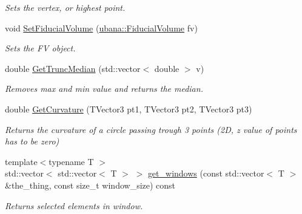 \begin{DoxyCompactItemize}
\begin{DoxyCompactList}\small\item\em Sets the vertex, or highest point. \end{DoxyCompactList}\item 
\hypertarget{classubana_1_1StoppingMuonTaggerHelper_a5cd4929695a6e0ed4cc0ba6985a06f29}{void \hyperlink{classubana_1_1StoppingMuonTaggerHelper_a5cd4929695a6e0ed4cc0ba6985a06f29}{Set\-Fiducial\-Volume} (\hyperlink{classubana_1_1FiducialVolume}{ubana\-::\-Fiducial\-Volume} fv)}\label{classubana_1_1StoppingMuonTaggerHelper_a5cd4929695a6e0ed4cc0ba6985a06f29}

\begin{DoxyCompactList}\small\item\em Sets the F\-V object. \end{DoxyCompactList}\item 
\hypertarget{classubana_1_1StoppingMuonTaggerHelper_af88861f6eeddba8278ddd835cdea21d6}{double \hyperlink{classubana_1_1StoppingMuonTaggerHelper_af88861f6eeddba8278ddd835cdea21d6}{Get\-Trunc\-Median} (std\-::vector$<$ double $>$ v)}\label{classubana_1_1StoppingMuonTaggerHelper_af88861f6eeddba8278ddd835cdea21d6}

\begin{DoxyCompactList}\small\item\em Removes max and min value and returns the median. \end{DoxyCompactList}\item 
\hypertarget{classubana_1_1StoppingMuonTaggerHelper_a942c23486b088ffcd2ca6e334c60e4dd}{double \hyperlink{classubana_1_1StoppingMuonTaggerHelper_a942c23486b088ffcd2ca6e334c60e4dd}{Get\-Curvature} (T\-Vector3 pt1, T\-Vector3 pt2, T\-Vector3 pt3)}\label{classubana_1_1StoppingMuonTaggerHelper_a942c23486b088ffcd2ca6e334c60e4dd}

\begin{DoxyCompactList}\small\item\em Returns the curvature of a circle passing trough 3 points (2\-D, z value of points has to be zero) \end{DoxyCompactList}\item 
\hypertarget{classubana_1_1StoppingMuonTaggerHelper_a08a974eedc9d301bc9f543046212cfa5}{{\footnotesize template$<$typename T $>$ }\\std\-::vector$<$ std\-::vector$<$ T $>$ $>$ \hyperlink{classubana_1_1StoppingMuonTaggerHelper_a08a974eedc9d301bc9f543046212cfa5}{get\-\_\-windows} (const std\-::vector$<$ T $>$ \&the\-\_\-thing, const size\-\_\-t window\-\_\-size) const }\label{classubana_1_1StoppingMuonTaggerHelper_a08a974eedc9d301bc9f543046212cfa5}

\begin{DoxyCompactList}\small\item\em Returns selected elements in window. \end{DoxyCompactList}\end{DoxyCompactItemize}
